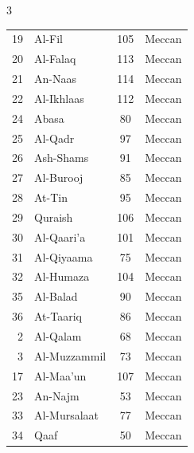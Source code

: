 \documentclass{article}
\begin{document}
\begin{center}
\begin{multicols}{3}
\begin{threeparttable}
\begin{tabular}{@{}r l c l@{}}
                19            & Al-Fil                & 105          & Meccan        \\
                20            & Al-Falaq              & 113          & Meccan        \\
                21            & An-Naas               & 114          & Meccan        \\
                22            & Al-Ikhlaas            & 112          & Meccan        \\
                24            & Abasa                 & 80           & Meccan        \\
                25            & Al-Qadr               & 97           & Meccan        \\
                26            & Ash-Shams             & 91           & Meccan        \\
                27            & Al-Burooj             & 85           & Meccan        \\
                28            & At-Tin                & 95           & Meccan        \\
                29            & Quraish               & 106          & Meccan        \\
                30            & Al-Qaari'a            & 101          & Meccan        \\
                31            & Al-Qiyaama            & 75           & Meccan        \\
                32            & Al-Humaza             & 104          & Meccan        \\
                35            & Al-Balad              & 90           & Meccan        \\
                36            & At-Taariq             & 86           & Meccan        \\
                2             & Al-Qalam\tnote{1}     & 68           & Meccan        \\
                3             & Al-Muzzammil\tnote{2} & 73           & Meccan        \\
                17            & Al-Maa'un\tnote{3}    & 107          & Meccan        \\
                23            & An-Najm\tnote{4}      & 53           & Meccan        \\
                33            & Al-Mursalaat\tnote{5} & 77           & Meccan        \\
                34            & Qaaf\tnote{6}         & 50           & Meccan        \\

\end{tabular}
\end{threeparttable}
\end{multicols}
\end{center}
\end{document}
